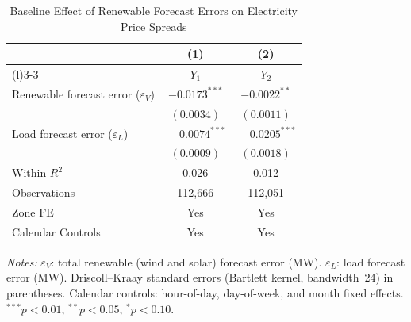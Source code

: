 \documentclass{article}
\begin{document}
\begin{table}[htbp]
\centering
\caption{Baseline Effect of Renewable Forecast Errors on Electricity Price Spreads}
\label{tab:h1}
\begin{threeparttable}
\begin{tabularx}{\linewidth}{>{\raggedright\arraybackslash}Xcc}
\toprule
 & (1) & (2) \\
\cmidrule(r){2-2}\cmidrule(l){3-3}
 & $Y_1$ & $Y_2$ \\
\midrule
Renewable forecast error ($\varepsilon_V$) & $-0.0173^{***}$ & $-0.0022^{**}$ \\
 & $(0.0034)$ & $(0.0011)$ \\[0.4ex]
Load forecast error ($\varepsilon_L$) & $\phantom{-}0.0074^{***}$ & $\phantom{-}0.0205^{***}$ \\
 & $(0.0009)$ & $(0.0018)$ \\
\midrule
Within $R^2$ & 0.026 & 0.012 \\
Observations & 112,666 & 112,051 \\
Zone FE & Yes & Yes \\
Calendar Controls & Yes & Yes \\
\bottomrule
\end{tabularx}
\begin{tablenotes}[flushleft]
\footnotesize
\item \textit{Notes:} $\varepsilon_V$: total renewable (wind and solar) forecast error (MW). $\varepsilon_L$: load forecast error (MW). Driscoll--Kraay standard errors (Bartlett kernel, bandwidth~24) in parentheses. Calendar controls: hour-of-day, day-of-week, and month fixed effects. $^{***}p<0.01$, $^{**}p<0.05$, $^{*}p<0.10$.
\end{tablenotes}
\end{threeparttable}
\end{table}
\end{document}
